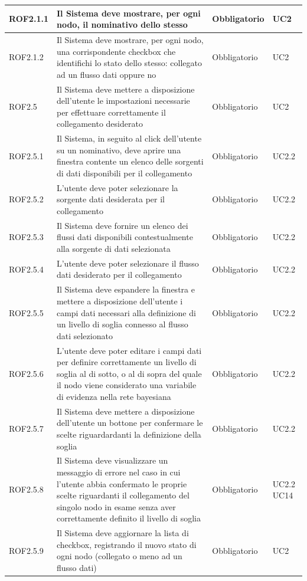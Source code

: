 \begin{center}
\begin{longtable}[c]{|m{}|m{}|m{}|m{}|}
\hline
\rowcolor{grigio}ROF2.1.1 & Il Sistema deve mostrare, per ogni nodo, il nominativo dello stesso & Obbligatorio & UC2\\
\hline
ROF2.1.2 & Il Sistema deve mostrare, per ogni nodo, una corrispondente checkbox che identifichi lo stato dello stesso: collegato ad un flusso dati oppure no & Obbligatorio & UC2\\
\hline
\rowcolor{grigio}ROF2.5 & Il Sistema deve mettere a disposizione dell'utente le impostazioni necessarie per effettuare correttamente il collegamento desiderato & Obbligatorio & UC2\\
\hline
ROF2.5.1 & Il Sistema, in seguito al click dell'utente su un nominativo, deve aprire una finestra contente un elenco delle sorgenti di dati disponibili per il collegamento & Obbligatorio & UC2.2\\
\hline
\rowcolor{grigio}ROF2.5.2 & L'utente deve poter selezionare la sorgente dati desiderata per il collegamento & Obbligatorio & UC2.2\\
\hline
ROF2.5.3 & Il Sistema deve fornire un elenco dei flussi dati disponibili contestualmente alla sorgente di dati selezionata & Obbligatorio & UC2.2\\
\hline
\rowcolor{grigio}ROF2.5.4 & L'utente deve poter selezionare il flusso dati desiderato per il collegamento & Obbligatorio & UC2.2\\
\hline
ROF2.5.5 & Il Sistema deve espandere la finestra e mettere a disposizione dell'utente i campi dati necessari alla definizione di un livello di soglia connesso al flusso dati selezionato & Obbligatorio & UC2.2\\
\hline
\rowcolor{grigio}ROF2.5.6 & L'utente deve poter editare i campi dati per definire correttamente un livello di soglia al di sotto, o al di sopra del quale il nodo viene considerato una variabile di evidenza nella rete bayesiana & Obbligatorio & UC2.2\\
\hline
ROF2.5.7 & Il Sistema deve mettere a disposizione dell'utente un bottone per confermare le scelte riguardardanti la definizione della soglia & Obbligatorio & UC2.2\\
\hline
\rowcolor{grigio}ROF2.5.8 & Il Sistema deve visualizzare un messaggio di errore nel caso in cui l'utente abbia confermato le proprie scelte riguardanti il collegamento del singolo nodo in esame senza aver correttamente definito il livello di soglia & Obbligatorio & UC2.2 UC14\\
\hline
ROF2.5.9 & Il Sistema deve aggiornare la lista di checkbox, registrando il nuovo stato di ogni nodo (collegato o meno ad un flusso dati) & Obbligatorio & UC2\\

\end{longtable}
\end{center}
